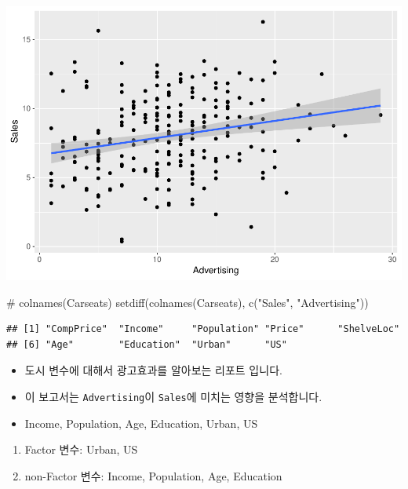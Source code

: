 \documentclass[a4paper]{article}
\newenvironment{Shaded}{}{}
\newcommand{\KeywordTok}[1]{\textcolor[rgb]{0.00,0.00,1.00}{#1}}
\newcommand{\StringTok}[1]{\textcolor[rgb]{0.00,0.50,0.50}{#1}}
\newcommand{\CommentTok}[1]{\textcolor[rgb]{0.00,0.50,0.00}{#1}}
\newcommand{\NormalTok}[1]{#1}
\providecommand{\tightlist}{%
  \setlength{\itemsep}{0pt}\setlength{\parskip}{0pt}}
\begin{document}
\includegraphics{class3_rmd_pdf_files/figure-latex/unnamed-chunk-3-1.pdf}

\begin{Shaded}
\begin{Highlighting}[]
\CommentTok{# colnames(Carseats)}
\KeywordTok{setdiff}\NormalTok{(}\KeywordTok{colnames}\NormalTok{(Carseats), }\KeywordTok{c}\NormalTok{(}\StringTok{"Sales"}\NormalTok{, }\StringTok{"Advertising"}\NormalTok{))}
\end{Highlighting}
\end{Shaded}

\begin{verbatim}
## [1] "CompPrice"  "Income"     "Population" "Price"      "ShelveLoc" 
## [6] "Age"        "Education"  "Urban"      "US"
\end{verbatim}

\begin{itemize}
\tightlist
\item
  도시 변수에 대해서 광고효과를 알아보는 리포트 입니다.\\
\item
  이 보고서는 \texttt{Advertising}이 \texttt{Sales}에 미치는 영향을
  분석합니다.\\
\item
  Income, Population, Age, Education, Urban, US
\end{itemize}

\begin{enumerate}
\def\labelenumi{\arabic{enumi}.}
\tightlist
\item
  Factor 변수: Urban, US\\
\item
  non-Factor 변수: Income, Population, Age, Education
\end{enumerate}
\end{document}
